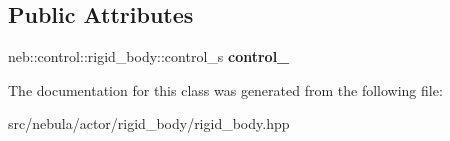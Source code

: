 \subsection*{Public Attributes}
\begin{DoxyCompactItemize}
\item 
\hypertarget{classneb_1_1Actor_1_1RigidBody_1_1RigidBody_a873b6a4d9a88f20b12cbae77aeed5607}{
neb::control::rigid\_\-body::control\_\-s {\bfseries control\_\-}}
\label{classneb_1_1Actor_1_1RigidBody_1_1RigidBody_a873b6a4d9a88f20b12cbae77aeed5607}

\end{DoxyCompactItemize}


The documentation for this class was generated from the following file:\begin{DoxyCompactItemize}
\item 
src/nebula/actor/rigid\_\-body/rigid\_\-body.hpp\end{DoxyCompactItemize}
